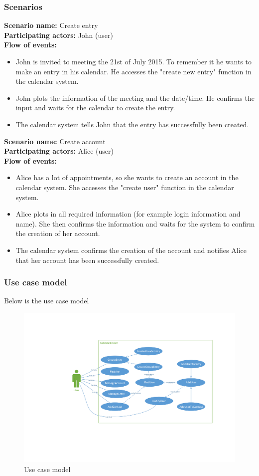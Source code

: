 \subsubsection{Scenarios}
\textbf{Scenario name:} Create entry
\\
\textbf{Participating actors:} John (user)
\\
\textbf{Flow of events:}
\begin{itemize}
\item John is invited to meeting the 21st of July 2015. To remember it he wants to make an entry in his calendar. He accesses the "create new entry" function in the calendar system.
\item John plots the information of the meeting and the date/time. He confirms the input and waits for the calendar to create the entry.
\item The calendar system tells John that the entry has successfully been created.
\end{itemize}
\textbf{Scenario name:} Create account
\\
\textbf{Participating actors:} Alice (user)
\\
\textbf{Flow of events:}
\begin{itemize}
\item Alice has a lot of appointments, so she wants to create an account in the calendar system. She accesses the "create user" function in the calendar system.
\item Alice plots in all required information (for example login information and name). She then confirms the information and waits for the system to confirm the creation of her account.
\item The calendar system confirms the creation of the account and notifies Alice that her account has been successfully created.
\end{itemize}
\pagebreak
\subsubsection{Use case model}
Below is the use case model
\begin{figure}[h]
\centering
\includegraphics[scale = 0.8]{usecase}
\caption{Use case model}
\end{figure}
\pagebreak
